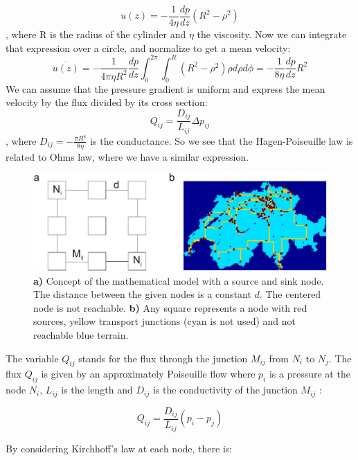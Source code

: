 \documentclass[11pt]{scrartcl}
\begin{document}
\begin{equation}
u(z)=-\frac{1}{4\eta}\frac{dp}{dz}(R^2-\rho^2)
\end{equation}
, where R is the radius of the cylinder and $\eta$ the viscosity. Now we can integrate that expression over a circle, and normalize to get a mean velocity:
\begin{equation}
\overline{u(z)}=-\frac{1}{4\pi\eta R^2}\frac{dp}{dz}\int_{0}^{2\pi}\int_{0}^{R}{(R^2-\rho^2)}\rho d\rho d\phi=-\frac{1}{8\eta}\frac{dp}{dz}R^2
\end{equation}
We can assume that the pressure gradient is uniform and express the mean velocity by the flux divided by its cross section:
\begin{equation}
Q_{ij}=\frac{D_{ij}}{L_{ij}}\Delta p_{ij}
\end{equation}
, where $D_{ij}=-\frac{\pi R^4}{8\eta}$ is the conductance. So we see that the Hagen-Poiseuille law is related to Ohms law, where we have a similar expression.
\begin{figure}[H]
	\centering
	\includegraphics[width=\textwidth]{figures/figure1}
	\caption{\textbf{a)} Concept of the mathematical model with a source and sink node. The distance between the given nodes is a constant $d$. The centered node is not reachable. \textbf{b)} Any square represents a node with red sources, yellow transport junctions (cyan is not used) and not reachable blue terrain.}
	\label{fig:schema}
\end{figure}

The variable $Q_{ij}$ stands for the flux through the junction $M_{ij}$ from $N_i$ to $N_j$. The flux $Q_{ij}$ is given by an approximately Poiseuille flow where $p_i$ is a pressure at the node $N_i$, $L_{ij}$ is the length and $D_{ij}$ is the conductivity of the junction $M_{ij}$ :

\begin{equation}
	\label{eq:1}
	Q_{ij}=\frac{D_{ij}}{L_{ij}}\left(p_i-p_j\right)
\end{equation}

By considering Kirchhoff's law at each node, there is:
\end{document}
